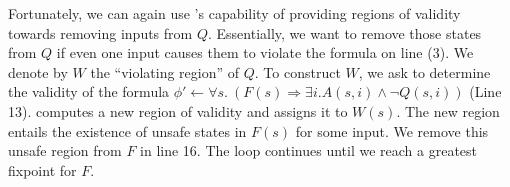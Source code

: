 Fortunately, we can again use \aeval's capability of providing regions of validity
towards removing inputs from $Q$.  Essentially, we want to remove those states from $Q$ if even one input causes them to violate the formula on line (3).  We denote by $W$ the ``violating region'' of $Q$.  To construct $W$, we ask \aeval to determine
the validity of the formula $\phi' \gets \forall s. \ (F(s) \Rightarrow \exists
i. A(s,i) \land \lnot Q(s,i))$ (Line 13). \aeval computes
a new region of validity and assigns it to $W(s)$. The new region entails
the existence of unsafe states in $F(s)$ for some input.  We remove this unsafe region from $F$ in line 16.   The loop continues until we reach a greatest fixpoint for $F$.  %






